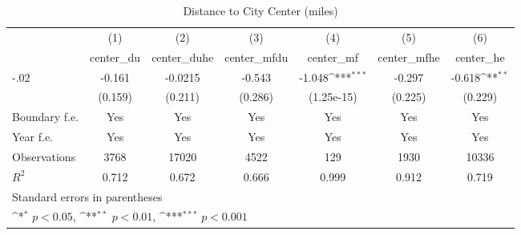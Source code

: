 \begin{table}[htbp]\centering
\def\sym#1{\ifmmode^{#1}\else\(^{#1}\)\fi}
\caption{Distance to City Center (miles)}
\begin{tabular}{l*{6}{c}}
\hline\hline
                    &\multicolumn{1}{c}{(1)}&\multicolumn{1}{c}{(2)}&\multicolumn{1}{c}{(3)}&\multicolumn{1}{c}{(4)}&\multicolumn{1}{c}{(5)}&\multicolumn{1}{c}{(6)}\\
                    &\multicolumn{1}{c}{center\_du}&\multicolumn{1}{c}{center\_duhe}&\multicolumn{1}{c}{center\_mfdu}&\multicolumn{1}{c}{center\_mf}&\multicolumn{1}{c}{center\_mfhe}&\multicolumn{1}{c}{center\_he}\\
\hline
-.02                &      -0.161         &     -0.0215         &      -0.543         &      -1.048\sym{***}&      -0.297         &      -0.618\sym{**} \\
                    &     (0.159)         &     (0.211)         &     (0.286)         &  (1.25e-15)         &     (0.225)         &     (0.229)         \\
[1em]
Boundary f.e.       &         Yes         &         Yes         &         Yes         &         Yes         &         Yes         &         Yes         \\
[1em]
Year f.e.           &         Yes         &         Yes         &         Yes         &         Yes         &         Yes         &         Yes         \\
\hline
Observations        &        3768         &       17020         &        4522         &         129         &        1930         &       10336         \\
\(R^{2}\)           &       0.712         &       0.672         &       0.666         &       0.999         &       0.912         &       0.719         \\
\hline\hline
\multicolumn{7}{l}{\footnotesize Standard errors in parentheses}\\
\multicolumn{7}{l}{\footnotesize \sym{*} \(p<0.05\), \sym{**} \(p<0.01\), \sym{***} \(p<0.001\)}\\
\end{tabular}
\end{table}
